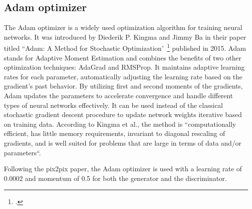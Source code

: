 \subsection{Adam optimizer}\label{subsubsec:adam-optimizer}
The Adam optimizer is a widely used optimization algorithm for training neural networks. 
It was introduced by Diederik P. Kingma and Jimmy Ba in their paper titled ``Adam: A Method for Stochastic Optimization'~\footcite{paper:kingma2014adam} published in 2015. 
Adam stands for Adaptive Moment Estimation and combines the benefits of two other optimization techniques: AdaGrad and RMSProp. It maintains adaptive learning rates for each parameter, automatically adjusting the learning rate based on the gradient's past behavior. 
By utilizing first and second moments of the gradients, Adam updates the parameters to accelerate convergence and handle different types of neural networks effectively.
It can be used instead of the classical stochastic gradient descent procedure to update network weights iterative based on training data.
According to Kingma et al., the method is ``computationally efficient, has little memory requirements, invariant to diagonal rescaling of gradients, and is well suited for problems that are large in terms of data and/or parameters``.
\par
Following the pix2pix paper, the Adam optimizer is used with a learning rate of 0.0002 and momentum of 0.5 for both the generator and the discriminator.
